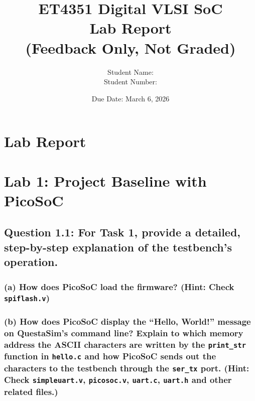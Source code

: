 \documentclass{article}
\title{
\vspace{-1.5cm}
\textcolor{tudelft}{\textbf{ET4351 Digital VLSI SoC \\ Lab Report \\(Feedback Only, Not Graded)}}
\vspace{0.5cm}
}
\author{Student Name: \underline{\hspace{5cm}} \\Student Number: \underline{\hspace{5cm}}}
\date{Due Date: March 6, 2026}
\begin{document}
\maketitle
\thispagestyle{fancy}

\section*{Lab Report}


\section{Lab 1: Project Baseline with PicoSoC}

\subsection*{Question 1.1: For Task 1, provide a detailed, step-by-step explanation of the testbench's operation.}

\subsubsection*{(a) How does PicoSoC load the firmware? (Hint: Check \texttt{spiflash.v})}

\begin{tcolorbox}[colback=white, colframe=black, width=\textwidth, height=0.3\textheight, title=Answer 1.1(a)]
\end{tcolorbox}

\subsubsection*{(b) How does PicoSoC display the ``Hello, World!'' message on QuestaSim's command line? Explain to which memory address the ASCII characters are written by the \texttt{print\_str} function in \texttt{hello.c} and how PicoSoC sends out the characters to the testbench through the \texttt{ser\_tx} port. (Hint: Check \texttt{simpleuart.v}, \texttt{picosoc.v}, \texttt{uart.c}, \texttt{uart.h} and other related files.)}

\begin{tcolorbox}[colback=white, colframe=black, width=\textwidth, height=0.4\textheight, title=Answer 1.1(b)]
\end{tcolorbox}
\end{document}

